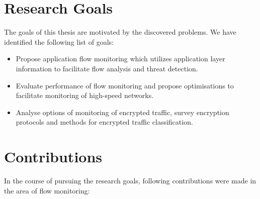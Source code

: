 \section{Research Goals}

The goals of this thesis are motivated by the discovered problems. We have identified the following list of goals:

\begin{itemize}
  \item Propose application flow monitoring which utilizes application layer information to facilitate flow analysis and threat detection.
  \item Evaluate performance of flow monitoring and propose optimisations to facilitate monitoring of high-speed networks.
  \item Analyse options of monitoring of encrypted traffic, survey encryption protocols and methods for encrypted traffic classification.
\end{itemize}


\section{Contributions}

In the course of pursuing the research goals, following contributions were made in the area of flow monitoring:

